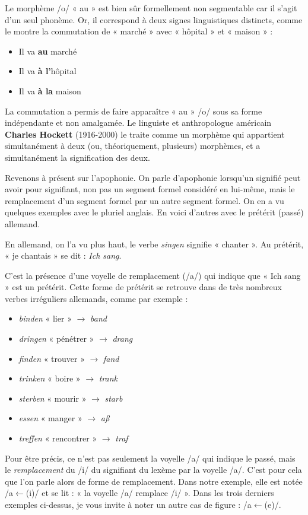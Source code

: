 Le morphème /o/ « au » est bien sûr formellement non segmentable car il s’agit d’un seul phonème. Or, il correspond à deux signes linguistiques distincts, comme le montre la commutation de « marché » avec « hôpital » et « maison » :
\begin{itemize}
\item Il va \textbf{au} marché 
\item Il va \textbf{à l’}hôpital 
\item Il va \textbf{à la} maison 
\end{itemize}
La commutation a permis de faire apparaître « au » /o/ sous sa forme indépendante et non amalgamée. Le linguiste et anthropologue américain \textbf{Charles Hockett} (1916-2000) le traite comme un morphème qui appartient simultanément à deux (ou, théoriquement, plusieurs) morphèmes, et a simultanément la signification des deux.

Revenons à présent sur l’apophonie. On parle d’apophonie lorsqu’un signifié peut avoir pour signifiant, non pas un segment formel considéré en lui-même, mais le remplacement d’un segment formel par un autre segment formel. On en a vu quelques exemples avec le pluriel anglais. En voici d’autres avec le prétérit (passé) allemand.

En allemand, on l’a vu plus haut, le verbe \textit{singen} signifie « chanter ». Au prétérit, « je chantais » se dit : \textit{Ich sang}.

C’est la présence d’une voyelle de remplacement (/a/) qui indique que « Ich sang » est un prétérit. Cette forme de prétérit se retrouve dans de très nombreux verbes irréguliers allemands, comme par exemple :
\begin{itemize}
\item \textit{binden} « lier » $\rightarrow$ \textit{band}
\item \textit{dringen} « pénétrer » $\rightarrow$ \textit{drang}
\item \textit{finden} « trouver » $\rightarrow$ \textit{fand}
\item \textit{trinken} « boire » $\rightarrow$ \textit{trank}
\item \textit{sterben} « mourir » $\rightarrow$ \textit{starb}
\item \textit{essen} « manger » $\rightarrow$ \textit{aß}
\item \textit{treffen} « rencontrer » $\rightarrow$ \textit{traf}
\end{itemize}
Pour être précis, ce n’est pas seulement la voyelle /a/ qui indique le passé, mais le \textit{remplacement} du /i/ du signifiant du lexème par la voyelle /a/. C’est pour cela que l’on parle alors de forme de remplacement. Dans notre exemple, elle est notée /a$\leftarrow$(i)/ et se lit : « la voyelle /a/ remplace /i/ ». Dans les trois derniers exemples ci-dessus, je vous invite à noter un autre cas de figure : /a$\leftarrow$(e)/.

